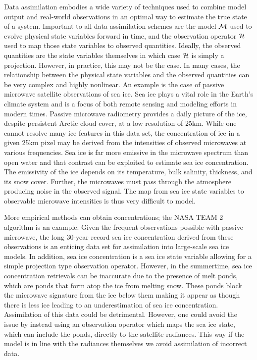 Data assimilation embodies a wide variety of techniques used to combine model output and real-world observations in an optimal way to estimate the true state of a system. Important to all data assimilation schemes are the model $\mathcal{M}$ used to evolve physical state variables forward in time, and the observation operator $\mathcal{H}$ used to map those state variables to observed quantities. Ideally, the observed quantities are the state variables themselves in which case $\mathcal{H}$ is simply a projection. However, in practice, this may not be the case. In many cases, the relationship between the physical state variables and the observed quantities can be very complex and highly nonlinear. An example is the case of passive microwave satellite observations of sea ice. Sea ice plays a vital role in the Earth's climate system and is a focus of both remote sensing and modeling efforts in modern times. Passive microwave radiometry provides a daily picture of the ice, despite persistent Arctic cloud cover, at a low resolution of 25km. While one cannot resolve many ice features in this data set, the concentration of ice in a given 25km pixel may be derived from the intensities of observed microwaves at various frequencies. Sea ice is far more emissive in the microwave spectrum than open water and that contrast can be exploited to estimate sea ice concentration. The emissivity of the ice depends on its temperature, bulk salinity, thickness, and its snow cover. Further, the microwaves must pass through the atmosphere producing noise in the observed signal. The map from sea ice state variables to observable microwave intensities is thus very difficult to model. 

\par More empirical methods can obtain concentrations; the NASA TEAM 2 algorithm is an example. Given the frequent observations possible with passive microwave, the long 30-year record sea ice concentration derived from these observations is an enticing data set for assimilation into large-scale sea ice models. In addition, sea ice concentration is a sea ice state variable allowing for a simple projection type observation operator. However, in the summertime, sea ice concentration retrievals can be inaccurate due to the presence of melt ponds, which are ponds that form atop the ice from melting snow. These ponds block the microwave signature from the ice below them making it appear as though there is less ice leading to an underestimation of sea ice concentration. Assimilation of this data could be detrimental. However, one could avoid the issue by instead using an observation operator which maps the sea ice state, which can include the ponds, directly to the satellite radiances. This way if the model is in line with the radiances themselves we avoid assimilation of incorrect data. 

